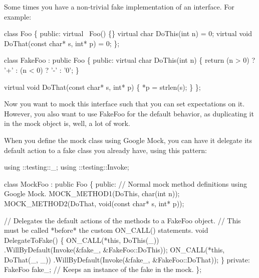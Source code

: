 Some times you have a non-\/trivial fake implementation of an interface. For example\+:


\begin{DoxyCode}
\textcolor{keyword}{class }Foo \{
 \textcolor{keyword}{public}:
  \textcolor{keyword}{virtual} ~Foo() \{\}
  \textcolor{keyword}{virtual} \textcolor{keywordtype}{char} DoThis(\textcolor{keywordtype}{int} n) = 0;
  \textcolor{keyword}{virtual} \textcolor{keywordtype}{void} DoThat(\textcolor{keyword}{const} \textcolor{keywordtype}{char}* s, \textcolor{keywordtype}{int}* p) = 0;
\};

\textcolor{keyword}{class }FakeFoo : \textcolor{keyword}{public} Foo \{
 \textcolor{keyword}{public}:
  \textcolor{keyword}{virtual} \textcolor{keywordtype}{char} DoThis(\textcolor{keywordtype}{int} n) \{
    \textcolor{keywordflow}{return} (n > 0) ? \textcolor{charliteral}{'+'} :
        (n < 0) ? \textcolor{charliteral}{'-'} : \textcolor{charliteral}{'0'};
  \}

  \textcolor{keyword}{virtual} \textcolor{keywordtype}{void} DoThat(\textcolor{keyword}{const} \textcolor{keywordtype}{char}* s, \textcolor{keywordtype}{int}* p) \{
    *p = strlen(s);
  \}
\};
\end{DoxyCode}


Now you want to mock this interface such that you can set expectations on it. However, you also want to use {\ttfamily Fake\+Foo} for the default behavior, as duplicating it in the mock object is, well, a lot of work.

When you define the mock class using Google Mock, you can have it delegate its default action to a fake class you already have, using this pattern\+:


\begin{DoxyCode}
using ::testing::\_;
using ::testing::Invoke;

\textcolor{keyword}{class }MockFoo : \textcolor{keyword}{public} Foo \{
 \textcolor{keyword}{public}:
  \textcolor{comment}{// Normal mock method definitions using Google Mock.}
  MOCK\_METHOD1(DoThis, \textcolor{keywordtype}{char}(\textcolor{keywordtype}{int} n));
  MOCK\_METHOD2(DoThat, \textcolor{keywordtype}{void}(\textcolor{keyword}{const} \textcolor{keywordtype}{char}* s, \textcolor{keywordtype}{int}* p));

  \textcolor{comment}{// Delegates the default actions of the methods to a FakeFoo object.}
  \textcolor{comment}{// This must be called *before* the custom ON\_CALL() statements.}
  \textcolor{keywordtype}{void} DelegateToFake() \{
    ON\_CALL(*\textcolor{keyword}{this}, DoThis(\_))
        .WillByDefault(Invoke(&fake\_, &FakeFoo::DoThis));
    ON\_CALL(*\textcolor{keyword}{this}, DoThat(\_, \_))
        .WillByDefault(Invoke(&fake\_, &FakeFoo::DoThat));
  \}
 \textcolor{keyword}{private}:
  FakeFoo fake\_;  \textcolor{comment}{// Keeps an instance of the fake in the mock.}
\};
\end{DoxyCode}


